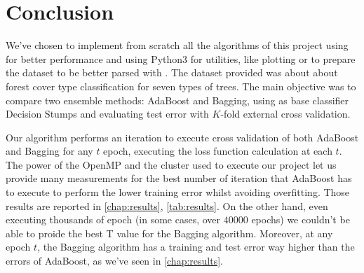 \chapter{Conclusion}
We've chosen to implement from scratch all the algorithms of this project using  for better performance and using Python3 for utilities, like plotting or to prepare the dataset to be better parsed with \CC. The dataset provided was about about forest cover type classification for seven types of trees. The main objective was to compare two ensemble methods: AdaBoost and Bagging, using as base classifier Decision Stumps and evaluating test error with $K$-fold external cross validation.

Our algorithm performs an iteration to execute cross validation of both AdaBoost and Bagging for any $t$ epoch, executing the loss function calculation at each $t$. The power of the OpenMP and the cluster used to execute our project let us provide many measurements for the best number of iteration that AdaBoost has to execute to perform the lower training error whilst avoiding overfitting. Those results are reported in \autoref{chap:results}, \autoref{tab:results}. On the other hand, even executing thousands of epoch (in some cases, over $40000$ epochs) we couldn't be able to proide the best T value for the Bagging algorithm. Moreover, at any epoch $t$, the Bagging algorithm has a training and test error way higher than the errors of AdaBoost, as we've seen in \autoref{chap:results}.